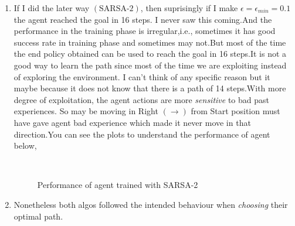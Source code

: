 \documentclass[journal,12pt,onecolumn]{IEEEtran}
\providecommand{\brak}[1]{\ensuremath{\left(#1\right)}}
\theoremstyle{remark}
\numberwithin{equation}{section}
\begin{document}
\begin{enumerate}
     \item If I did the later way $\brak{\text{SARSA-2}}$, then suprisingly if I make $\epsilon = \epsilon_{min} = 0.1$ the agent reached the goal in 16 steps. I never saw this coming.And the performance in the training phase is irregular,i.e., sometimes it has good success rate in training phase and sometimes may not.But most of the time the end policy obtained can be used to reach the goal in 16 steps.It is not a good way to learn the path since most of the time we are exploiting instead of exploring the environment. I can't think of any specific reason but it maybe because it does not know that there is a path of 14 steps.With more degree of exploitation, the agent actions are more \textit{sensitive} to bad past experiences. So may be moving in Right $\brak{\rightarrow}$ from Start position must have gave agent bad experience which made it never move in that direction.You can see the plots to understand the performance of agent below, 
		 
	      \begin{figure}[ht]%
                \centering
		\\
                \caption{Performance of agent trained with SARSA-2}%
                \label{sarsa-2}%
             \end{figure}

	 \item Nonetheless both algos followed the intended behaviour when \textit{choosing} their optimal path.
	\end{enumerate}
\end{document}
